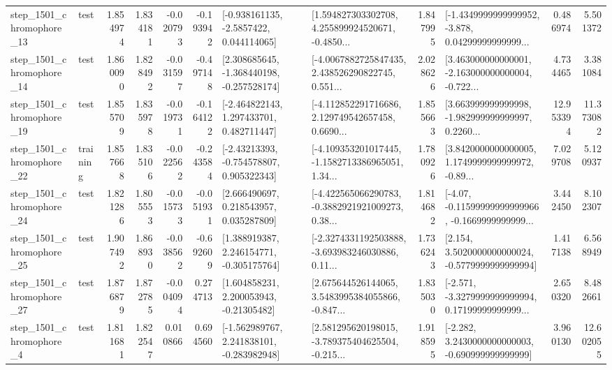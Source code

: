 \begin{tabular}{llrrrrllrlrr}
 step\_1501\_chromophore\_13 &      test &      1.854974 &    1.834181 &     -0.020793 & -0.193942 &     [-0.938161135, -2.5857422, 0.044114065] &  [1.594827303302708, 4.255899924520671, -0.4850... &       1.847995 &  [-1.4349999999999952, -3.878, 0.04299999999999... &            0.486974 &          5.501372 \\
 step\_1501\_chromophore\_14 &      test &      1.860090 &    1.828492 &     -0.031597 & -0.497148 &   [2.308685645, -1.368440198, -0.257528174] &  [-4.0067882725847435, 2.438526290822745, 0.551... &       2.028626 &  [3.463000000000001, -2.163000000000004, -0.722... &            4.734465 &          3.381084 \\
 step\_1501\_chromophore\_19 &      test &      1.855709 &    1.835978 &     -0.019731 & -0.164122 &    [-2.464822143, 1.297433701, 0.482711447] &  [-4.112852291716686, 2.129749542657458, 0.6690... &       1.855663 &  [3.663999999999998, -1.982999999999997, 0.2260... &           12.953394 &         11.373082 \\
 step\_1501\_chromophore\_22 &  training &      1.857668 &    1.835106 &     -0.022562 & -0.243584 &    [-2.43213393, -0.754578807, 0.905322343] &  [-4.109353201017445, -1.1582713386965051, 1.34... &       1.780926 &  [3.8420000000000005, 1.1749999999999972, -0.89... &            7.029708 &          5.120937 \\
 step\_1501\_chromophore\_24 &      test &      1.821286 &    1.805553 &     -0.015733 & -0.051931 &     [2.666490697, 0.218543957, 0.035287809] &  [-4.422565066290783, -0.3882921921009273, 0.38... &       1.814682 &  [-4.07, -0.11599999999999966, -0.1669999999999... &            3.442450 &          8.102307 \\
 step\_1501\_chromophore\_25 &      test &      1.907492 &    1.868930 &     -0.038562 & -0.692609 &    [1.388919387, 2.246154771, -0.305175764] &  [-2.3274331192503888, -3.693983246030886, 0.11... &       1.736243 &   [2.154, 3.5020000000000024, -0.5779999999999994] &            1.417138 &          6.568949 \\
 step\_1501\_chromophore\_27 &      test &      1.876879 &    1.872785 &     -0.004094 &  0.274713 &     [1.604858231, 2.200053943, -0.21305482] &  [2.675644526144065, 3.5483995384055866, -0.847... &       1.835030 &  [-2.571, -3.3279999999999994, 0.17199999999999... &            2.650320 &          8.482661 \\
  step\_1501\_chromophore\_4 &      test &      1.811681 &    1.822547 &      0.010866 &  0.694560 &   [-1.562989767, 2.241838101, -0.283982948] &  [2.581295620198015, -3.789375404625504, -0.215... &       1.918595 &   [-2.282, 3.2430000000000003, -0.690999999999999] &            3.960130 &         12.602055 \\

\end{tabular}
